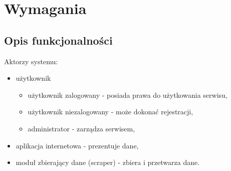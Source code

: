 \documentclass[12pt, titlepage]{article}
\begin{document}
	\section{Wymagania}
	\subsection{Opis funkcjonalności}
	{\large Aktorzy systemu:
	\begin{itemize}
		\item użytkownik
			\begin{itemize}
				\item użytkownik zalogowany - posiada prawa do użytkowania serwisu,
				\item użytkownik niezalogowany - może dokonać rejestracji,
				\item administrator - zarządza serwisem,
			\end{itemize}
		\item aplikacja internetowa - prezentuje dane,
		\item moduł zbierający dane (scraper) - zbiera i przetwarza dane. \newline
	\end{itemize}}
\end{document}
